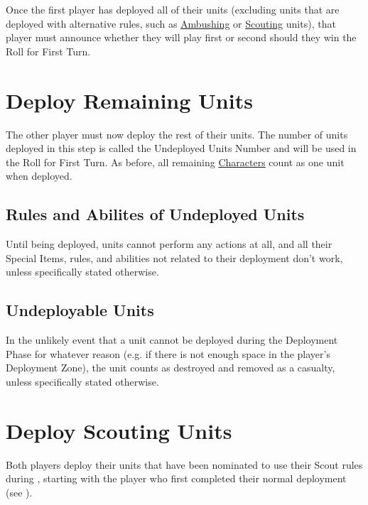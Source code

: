 Once the first player has deployed all of their units (excluding units that are deployed with alternative rules, such as \hyperref[ambush]{Ambushing} or \hyperref[scout]{Scouting} units), that player must announce whether they will play first or second should they win the Roll for First Turn.

\section{Deploy Remaining Units}
\label{deploy_remaining_units}

The other player must now deploy the rest of their units. The number of units deployed in this step is called the Undeployed Units Number and will be used in the Roll for First Turn. As before, all remaining \hyperref[characters]{Characters} count as one unit when deployed.

\subsection{Rules and Abilites of Undeployed Units}
\label{rules_and_abilities_of_undeployed_units}

Until being deployed, units cannot perform any actions at all, and all their Special Items, rules, and abilities not related to their deployment don’t work, unless specifically stated otherwise.

\subsection{Undeployable Units}
\label{undeployable_units}

In the unlikely event that a unit cannot be deployed during the Deployment Phase for whatever reason (e.g. if there is not enough space in the player's Deployment Zone), the unit counts as destroyed and removed as a casualty, unless specifically stated otherwise.

\section{Deploy Scouting Units}

Both players deploy their units that have been nominated to use their Scout rules during , starting with the player who first completed their normal deployment (see ).

